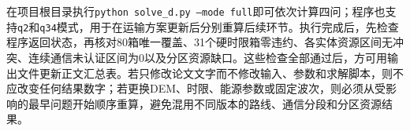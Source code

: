 在项目根目录执行\texttt{python solve\_d.py --mode full}即可依次计算四问；程序也支持\texttt{q2}和\texttt{q34}模式，用于在运输方案更新后分别重算后续环节。执行完成后，先检查程序返回状态，再核对80箱唯一覆盖、31个硬时限箱零违约、各实体资源区间无冲突、连续通信未认证区间为0以及分区资源缺口。这些检查全部通过后，方可用输出文件更新正文汇总表。若只修改论文文字而不修改输入、参数和求解脚本，则不应改变任何结果数字；若更换DEM、时限、能源参数或固定波次，则必须从受影响的最早问题开始顺序重算，避免混用不同版本的路线、通信分段和分区资源结果。
